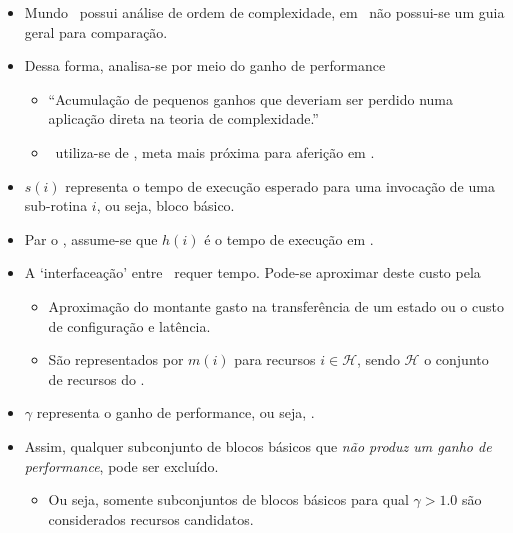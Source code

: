    \begin{frame}
      \begin{itemize}
         \item Mundo \software\ possui análise de ordem de complexidade, em \hardware\ não possui-se um guia geral para comparação.

         \item Dessa forma, analisa-se por meio do ganho de performance
         \begin{itemize}
            \item ``Acumulação de pequenos ganhos que deveriam ser perdido numa aplicação direta na teoria de complexidade.''
            \item \Software\ utiliza-se de \profile, meta mais próxima para aferição em \hardware.
         \end{itemize}

         \item $ s(i) $ representa o tempo de execução esperado para uma invocação de uma sub-rotina $ i $, ou seja, bloco básico.
      \end{itemize}
   \end{frame}


   \begin{frame}
      \begin{itemize}
         \item Par o \hardware, assume-se que $ h(i) $ é o tempo de execução em \hardware.

         \item A `interfaceação' entre \hs\ requer tempo. Pode-se aproximar deste custo pela
         \begin{itemize}
            \item Aproximação do montante gasto na transferência de um estado ou o custo de configuração e latência.
            \item São representados por $ m(i) $ para recursos $ i \in \mathcal{H} $, sendo $\mathcal{H}$ o conjunto de recursos do \hardware.
         \end{itemize}

         \item $ \gamma $ representa o ganho de performance, ou seja, \speedup.

         \item Assim, qualquer subconjunto de blocos básicos que \textit{não produz um ganho de performance}, pode ser excluído.
         \begin{itemize}
            \item Ou seja, somente subconjuntos de blocos básicos para qual $ \gamma > 1.0 $ são considerados recursos candidatos.
         \end{itemize}

      \end{itemize}
   \end{frame}

